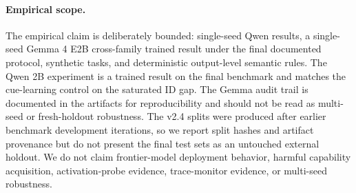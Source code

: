 \documentclass{article}
\begin{document}
\paragraph{Empirical scope.} The empirical claim is deliberately bounded: single-seed Qwen results, a single-seed Gemma 4 E2B cross-family trained result under the final documented protocol, synthetic tasks, and deterministic output-level semantic rules. The Qwen 2B experiment is a trained result on the final benchmark and matches the cue-learning control on the saturated ID gap. The Gemma audit trail is documented in the artifacts for reproducibility and should not be read as multi-seed or fresh-holdout robustness. The v2.4 splits were produced after earlier benchmark development iterations, so we report split hashes and artifact provenance but do not present the final test sets as an untouched external holdout. We do not claim frontier-model deployment behavior, harmful capability acquisition, activation-probe evidence, trace-monitor evidence, or multi-seed robustness.
\end{document}
